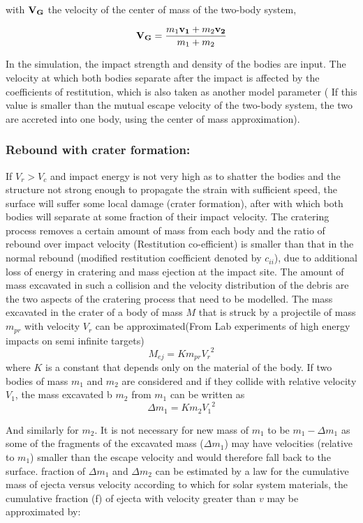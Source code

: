 with ${\bf V _{G}}$ the velocity of the center of mass of the two-body system,

\begin{equation}
{\bf V_{G}} = \frac{m_{1}{\bf{v_{1}}}+m_{2}{\bf{v_{2}}}}{m_{1}+m_{2}}
\end{equation}

In the simulation, the impact strength and density of the bodies are  input. The velocity at which both bodies separate after the impact is affected by the coefficients of restitution, which is also taken as another model parameter ( If this value is smaller than the mutual escape velocity of the two-body system, the two  are accreted into one body, using the center of mass approximation).

\subsubsection{Rebound with crater formation:}
If $V_{r}>V_{c}$ and impact energy is not very high as to shatter the bodies and the structure not strong enough to propagate the strain with sufficient speed, the surface will suffer some local damage (crater formation), after with which both bodies will separate at some fraction of their impact velocity. The cratering process removes a certain amount of mass from each body and the ratio of rebound over impact velocity (Restitution co-efficient) is smaller than that in the normal rebound (modified restitution coefficient denoted by $c_{ii}$), due to additional loss of energy in cratering and mass ejection at the impact site.
The amount of mass excavated in such a collision and the velocity distribution of the debris are the two aspects of the cratering process that need to be modelled. The mass excavated in the crater of a body of mass $M$ that is struck by a projectile of mass $m_{pr}$ with velocity $V_{r}$ can be approximated(From Lab experiments of high energy impacts on semi infinite targets)
\begin{equation}
M_{ej} =  Km_{pr}{V_{r}}^{2}
\end{equation}
where $K$ is a constant that depends only on the material of the body. If  two bodies of mass $m_{1}$ and $m_{2}$ are considered and  if they collide with relative velocity $V_{1}$, the mass excavated b $m_{2}$ from $m_{1}$ can be written as
\begin{equation}
\Delta m_{1} = Km_{2}{V_{1}}^2
\end{equation}


And similarly for $m_{2}$. It is not necessary for new mass of $m_{1}$ to be $m_{1}-\Delta m_{1}$ as some of the fragments of the excavated mass ($\Delta m_{1}$) may have velocities (relative to $m_{1}$) smaller than the escape velocity and would therefore fall back to the surface. 
fraction of $\Delta m_{1}$ and $\Delta m_{2}$ can be estimated  by a law for the cumulative mass of ejecta versus velocity according to which for solar system materials, the cumulative fraction (f) of ejecta with velocity greater than $v$ may be approximated by:

